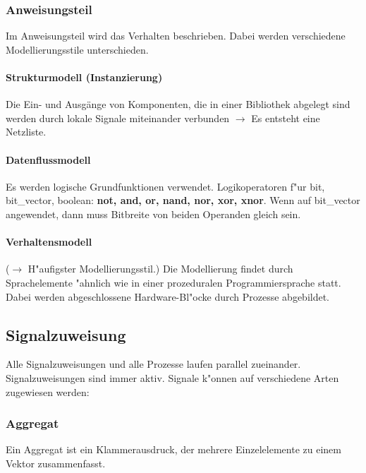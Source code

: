 \vspace{-\baselineskip}
\begin{multicols}{2}
	\subsubsection{Anweisungsteil}
	Im Anweisungsteil wird das Verhalten beschrieben. Dabei werden verschiedene Modellierungsstile unterschieden.
	\paragraph{Strukturmodell (Instanzierung)}
	Die Ein- und Ausgänge von Komponenten, die in einer Bibliothek abgelegt sind werden durch lokale Signale miteinander verbunden $\rightarrow$ Es entsteht eine Netzliste. 
	
	\columnbreak
	\paragraph{Datenflussmodell}
	Es werden logische Grundfunktionen verwendet.
	Logikoperatoren f"ur bit, bit\_vector, boolean: \textbf{not, and, or, nand, nor, xor, xnor}. Wenn auf bit\_vector angewendet, dann muss Bitbreite von beiden Operanden gleich sein.
	
	\paragraph{Verhaltensmodell} ($\rightarrow$ H"aufigster Modellierungsstil.) 
	Die Modellierung findet durch Sprachelemente "ahnlich wie in einer prozeduralen Programmiersprache statt. Dabei werden abgeschlossene Hardware-Bl"ocke durch Prozesse 
	abgebildet.
\end{multicols}
			
\begin{multicols}{2}
	\subsection{Signalzuweisung}
	Alle Signalzuweisungen und alle Prozesse laufen parallel zueinander. Signalzuweisungen sind immer aktiv. Signale k"onnen auf verschiedene Arten zugewiesen werden:
	
	\subsubsection{Aggregat}
	Ein Aggregat ist ein Klammerausdruck, der mehrere Einzelelemente zu einem Vektor zusammenfasst.
		
\end{multicols}
	
